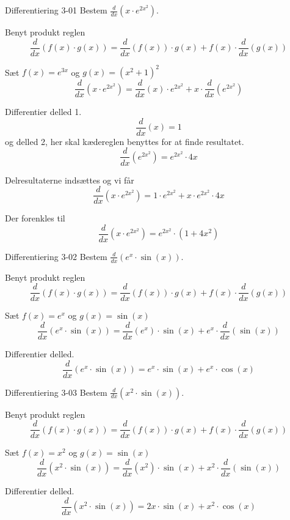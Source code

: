\documentclass{article}
\begin{document}
\tableofcontents
\newpage

\begin{exercise}{Differentiering 3-01}
Bestem $\frac{d}{dx} \left( x \cdot e^{2x^2} \right)$.


\hint
Benyt produkt reglen
\[
\frac{d}{dx} \left( f(x) \cdot g(x) \right) = \frac{d}{dx} \left( f(x) \right) \cdot g(x) + f(x) \cdot \frac{d}{dx} \left( g(x) \right)
\]

\hint
Sæt $f(x) = e^{3x}$ og $g(x) = \left(x^2 + 1\right)^2$
\[
\frac{d}{dx} \left( x \cdot e^{2x^2} \right) = \frac{d}{dx} \left( x \right) \cdot e^{2x^2} + x \cdot \frac{d}{dx} \left( e^{2x^2} \right)
\]

\hint
Differentier delled 1.
\[
\frac{d}{dx} \left( x \right) = 1
\]
og delled 2, her skal kædereglen benyttes for at finde resultatet.
\[
\frac{d}{dx} \left( e^{2x^2} \right) = e^{2x^2} \cdot 4x
\]


\hint
Delresultaterne indsættes og vi får
\[
\frac{d}{dx} \left( x \cdot e^{2x^2} \right) = 1 \cdot e^{2x^2} + x \cdot e^{2x^2} \cdot 4x
\]

\hint
Der forenkles til
\[
\frac{d}{dx} \left( x \cdot e^{2x^2} \right) = e^{2x^2} \cdot (1 + 4x^2)
\]

\end{exercise}


\begin{exercise}{Differentiering 3-02}
Bestem $\frac{d}{dx} \left( e^x \cdot \sin(x) \right)$.


\hint
Benyt produkt reglen
\[
\frac{d}{dx} \left( f(x) \cdot g(x) \right) = \frac{d}{dx} \left( f(x) \right) \cdot g(x) + f(x) \cdot \frac{d}{dx} \left( g(x) \right)
\]

\hint
Sæt $f(x) = e^x$ og $g(x) = \sin(x)$
\[
\frac{d}{dx} \left( e^x \cdot \sin(x) \right) = \frac{d}{dx} \left( e^x \right) \cdot \sin(x) + e^x \cdot \frac{d}{dx} \left( \sin(x) \right)
\]

\hint
Differentier delled.
\[
\frac{d}{dx} \left( e^x \cdot \sin(x) \right) = e^x \cdot \sin(x) + e^x \cdot \cos(x)
\]
\end{exercise}


\begin{exercise}{Differentiering 3-03}
Bestem $\frac{d}{dx} \left( x^2 \cdot \sin(x) \right)$.


\hint
Benyt produkt reglen
\[
\frac{d}{dx} \left( f(x) \cdot g(x) \right) = \frac{d}{dx} \left( f(x) \right) \cdot g(x) + f(x) \cdot \frac{d}{dx} \left( g(x) \right)
\]

\hint
Sæt $f(x) = x^2$ og $g(x) = \sin(x)$
\[
\frac{d}{dx} \left( x^2 \cdot \sin(x) \right) = \frac{d}{dx} \left( x^2 \right) \cdot \sin(x) + x^2 \cdot \frac{d}{dx} \left( \sin(x) \right)
\]

\hint
Differentier delled.
\[
\frac{d}{dx} \left( x^2 \cdot \sin(x) \right) = 2x \cdot \sin(x) + x^2 \cdot \cos(x)
\]
\end{exercise}
\end{document}
